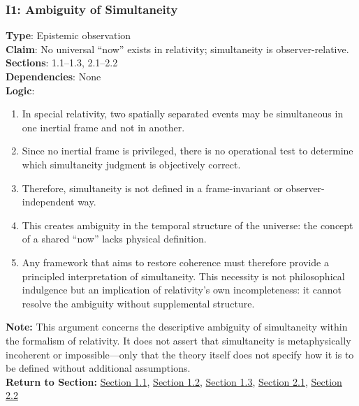 \documentclass[12pt]{book}
\begin{document}
\subsubsection*{I1: Ambiguity of Simultaneity}
\label{appendix:I1}
\textbf{Type}: Epistemic observation\\
\textbf{Claim}: No universal ``now'' exists in relativity; simultaneity is observer-relative.\\
\textbf{Sections}: 1.1–1.3, 2.1–2.2\\
\textbf{Dependencies}: None\\
\textbf{Logic}:
\begin{enumerate}
    \item In special relativity, two spatially separated events may be simultaneous in one inertial frame and not in another.
    \item Since no inertial frame is privileged, there is no operational test to determine which simultaneity judgment is objectively correct.
    \item Therefore, simultaneity is not defined in a frame-invariant or observer-independent way.
    \item This creates ambiguity in the temporal structure of the universe: the concept of a shared ``now'' lacks physical definition.
    \item Any framework that aims to restore coherence must therefore provide a principled interpretation of simultaneity. This necessity is not philosophical indulgence but an implication of relativity's own incompleteness: it cannot resolve the ambiguity without supplemental structure.
\end{enumerate}
\textbf{Note:} This argument concerns the descriptive ambiguity of simultaneity within the formalism of relativity. It does not assert that simultaneity is metaphysically incoherent or impossible---only that the theory itself does not specify how it is to be defined without additional assumptions. \\
\textbf{Return to Section:} \hyperref[sec:1.1]{Section 1.1}, \hyperref[sec:1.2]{Section 1.2}, \hyperref[sec:1.3]{Section 1.3}, \hyperref[sec:2.1]{Section 2.1}, \hyperref[sec:2.2]{Section 2.2}
\end{document}
